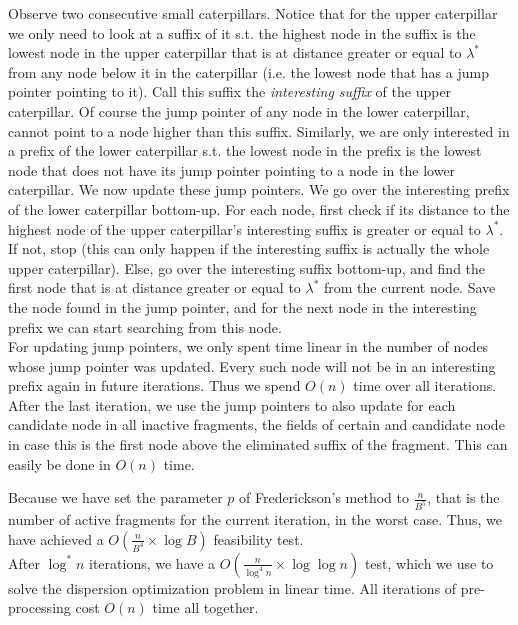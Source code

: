 \documentclass[11pt,a4paper]{article}
\theoremstyle{definition}
\theoremstyle{remark}
\begin{document}
Observe two consecutive small caterpillars. Notice that for the upper caterpillar we only need to look at a suffix of it s.t. the highest node in the suffix is the lowest node in the upper caterpillar that is at distance greater or equal to $\lambda ^*$ from any node below it in the caterpillar (i.e. the lowest node that has a jump pointer pointing to it). Call this suffix the \emph{interesting suffix} of the upper caterpillar. Of course the jump pointer of any node in the lower caterpillar, cannot point to a node higher than this suffix. Similarly, we are only interested in a prefix of the lower caterpillar s.t. the lowest node in the prefix is the lowest node that does not have its jump pointer pointing to a node in the lower caterpillar. We now update these jump pointers. We go over the interesting prefix of the lower caterpillar bottom-up. For each node, first check if its distance to the highest node of the upper caterpillar's interesting suffix is greater or equal to $\lambda ^*$. If not, stop (this can only happen if the interesting suffix is actually the whole upper caterpillar). Else, go over the interesting suffix bottom-up, and find the first node that is at distance greater or equal to $\lambda ^*$ from the current node. Save the node found in the jump pointer, and for the next node in the interesting prefix we can start searching from this node.\\
For updating jump pointers, we only spent time linear in the number of nodes whose jump pointer was updated. Every such node will not be in an interesting prefix again in future iterations. Thus we spend $O(n)$ time over all iterations. After the last iteration, we use the jump pointers to also update for each candidate node in all inactive fragments, the fields of certain and candidate node in case this is the first node above the eliminated suffix of the fragment. This can easily be done in $O(n)$ time. %

Because we have set the parameter $p$ of Frederickson's method to $\frac{n}{B^5}$, that is the number of active fragments for the current iteration, in the worst case. Thus, we have achieved a $O(\frac{n}{B^4} \times \log B)$ feasibility test.\\
After $\log ^*n$ iterations, we have a $O(\frac{n}{\log ^4n} \times \log \log n)$ test, which we use to solve the dispersion optimization problem in linear time. All iterations of pre-processing cost $O(n)$ time all together.



\end{document}
